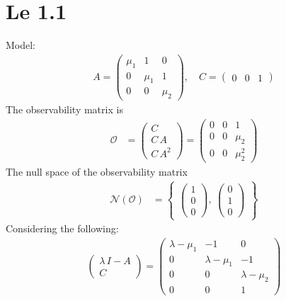 \section{Le 1.1}
Model: 
\begin{align*}
    A = \begin{pmatrix}
        \mu_1 & 1 & 0 \\ 0 & \mu_1 & 1 \\ 0 & 0 & \mu_2
    \end{pmatrix}, \quad C = \begin{pmatrix}
        0 & 0 & 1
    \end{pmatrix}
\end{align*}
The observability matrix is 
\begin{align*}
    \mathcal{O} &= \begin{pmatrix}
        C \\ C\,A \\ C\,A^2
    \end{pmatrix} = \begin{pmatrix}
        0 & 0 & 1 \\ 0 & 0 & \mu_2 \\ 0 & 0 & \mu_2^2 
    \end{pmatrix}
\end{align*}
The null space of the observability matrix
\begin{align*}
    \mathcal{N}\left(\mathcal{O}\right) &= \begin{Bmatrix}
        \begin{pmatrix}
            1 \\ 0 \\ 0
        \end{pmatrix},\ \begin{pmatrix}
            0 \\ 1 \\ 0
        \end{pmatrix}
    \end{Bmatrix}
\end{align*}
Considering the following:
\begin{align*}
    \begin{pmatrix}
        \lambda\,I - A \\ C
    \end{pmatrix} = \begin{pmatrix}
        \lambda - \mu_1 & -1 & 0 \\ 0 & \lambda - \mu_1 & -1\\ 0 & 0 & \lambda - \mu_2 \\ 0 & 0 & 1
    \end{pmatrix}
\end{align*}

